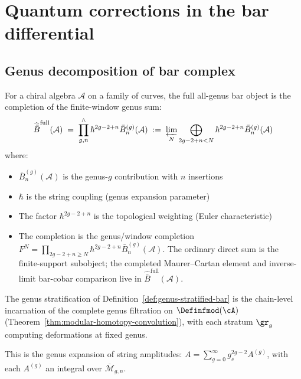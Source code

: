 \section{Quantum corrections in the bar differential}
\label{sec:quantum-corrections-bar}

\subsection{Genus decomposition of bar complex}

\begin{definition}
\label{def:genus-stratified-bar}
\label{def:geometric-bar-genus-stratified}
For a chiral algebra $\mathcal{A}$ on a family of curves, the full
all-genus bar object is the completion of the finite-window genus
sum:
\begin{equation}
\widehat{\bar{B}}^{\mathrm{full}}(\mathcal{A})
\;=\;
\prod_{g,n}^{\wedge}
\hbar^{2g-2+n}\bar{B}^{(g)}_n(\mathcal{A})
\;:=\;
\varprojlim_N
\bigoplus_{2g-2+n<N}
\hbar^{2g-2+n}\bar{B}^{(g)}_n(\mathcal{A})
\end{equation}
where:
\begin{itemize}
\item $\bar{B}^{(g)}_n(\mathcal{A})$ is the genus-$g$ contribution with $n$ insertions
\item $\hbar$ is the string coupling (genus expansion parameter)
\item The factor $\hbar^{2g-2+n}$ is the topological weighting (Euler characteristic)
\item The completion is the genus/window completion
 $F^N=\prod_{2g-2+n\ge N}
 \hbar^{2g-2+n}\bar{B}^{(g)}_n(\mathcal A)$.
 The ordinary direct sum is the finite-support subobject; the
 completed Maurer--Cartan element and inverse-limit bar-cobar
 comparison live in $\widehat{\bar{B}}^{\mathrm{full}}(\mathcal A)$.
\end{itemize}
\end{definition}

\begin{remark}
\label{rem:genus-filtration-deformation}
The genus stratification of
Definition~\ref{def:genus-stratified-bar} is the chain-level
incarnation of the complete genus filtration on $\Definfmod(\cA)$
(Theorem~\ref{thm:modular-homotopy-convolution}), with each stratum
$\gr_g$ computing deformations at fixed genus.
\end{remark}

\begin{remark}
\label{rem:string-theory-genus}
This is the genus expansion of string amplitudes:
$A = \sum_{g=0}^\infty g_s^{2g-2} A^{(g)}$, with each $A^{(g)}$ an integral over $\overline{\mathcal{M}}_{g,n}$.
\end{remark}

